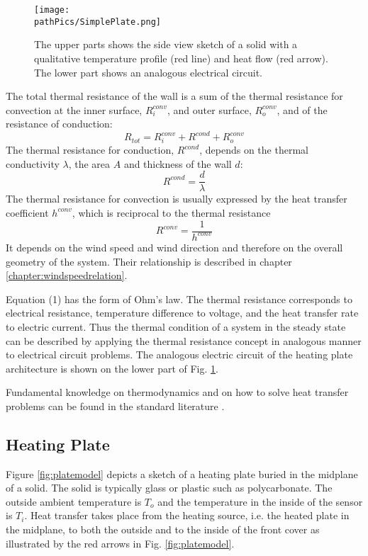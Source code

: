 \begin{figure} [H]
	\centering
	\texttt{[image: \\pathPics/SimplePlate.png]}
	\caption[SimplePlate]{The upper parts shows the side view sketch of a solid with a qualitative temperature profile (red line) and heat flow (red arrow). The lower part shows an analogous electrical circuit.}
	\label{fig:simpleplate}
\end{figure}

The total thermal resistance of the wall is a sum of the thermal resistance for convection at the inner surface, \(R_i^{conv}\), and outer surface, \(R_o^{conv}\), and of the resistance of conduction: 
\begin{equation}
R_{tot} =  R_i^{conv} + R^{cond} + R_o^{conv}
\end{equation}
The thermal resistance for conduction, \(R^{cond}\), depends on the thermal conductivity \(\lambda\), the area \(A\) and thickness of the wall \(d\):
\begin{equation}
R^{cond} =  \frac{d}{\lambda}
\end{equation}
The thermal resistance for convection is usually expressed by the heat transfer coefficient $h^{conv}$, which is reciprocal to the thermal resistance
\begin{equation}
R^{conv} =  \frac{1}{h^{conv}}
\end{equation}
It depends on the wind speed and wind direction and therefore on the overall geometry of the system. Their relationship is described in chapter \ref{chapter:windspeedrelation}.

Equation (1) has the form of Ohm's law. The thermal resistance corresponds to electrical resistance, temperature difference to voltage, and the heat transfer rate to electric current. Thus the thermal condition of a system in the steady state can be described by applying the thermal resistance concept in analogous manner to electrical circuit problems. The analogous electric circuit of the heating plate architecture is shown on the lower part of Fig. \ref{fig:simpleplate}. 

Fundamental knowledge on thermodynamics and on how to solve heat transfer problems can be found in the standard literature \cite{Unnamed-2, Unnamed-3}. 

\subsection{Heating Plate}\label{chapter:heatingplate}
Figure \ref{fig:platemodel} depicts a sketch of a heating plate buried in the midplane of a solid. The solid is typically glass or plastic such as polycarbonate. The outside ambient temperature is $T_o$ and the temperature in the inside of the sensor is $T_i$. Heat transfer takes place from the heating source, i.e. the heated plate in the midplane, to both the outside and to the inside of the front cover as illustrated by the red arrows in Fig. \ref{fig:platemodel}.  

